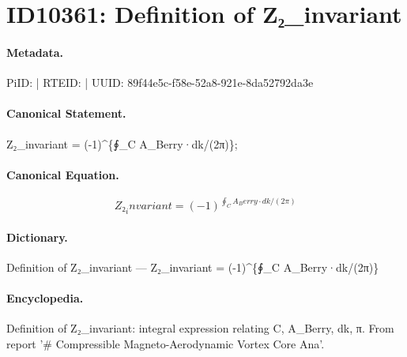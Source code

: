 \section*{ID10361: Definition of Z₂\_invariant}
\paragraph{Metadata.}
PiID:  | RTEID:  | UUID: 89f44e5c-f58e-52a8-921e-8da52792da3e

\paragraph{Canonical Statement.}
Z₂\_invariant = (-1)\textasciicircum{}\{∮\_C A\_Berry·dk/(2π)\};

\paragraph{Canonical Equation.}
\[
Z₂_invariant = (-1)^{∮_C A_Berry·dk/(2π)}
\]

\paragraph{Dictionary.}
Definition of Z₂\_invariant — Z₂\_invariant = (-1)\textasciicircum{}\{∮\_C A\_Berry·dk/(2π)\}

\paragraph{Encyclopedia.}
Definition of Z₂\_invariant: integral expression relating C, A\_Berry, dk, π. From report '\# Compressible Magneto-Aerodynamic Vortex Core Ana'.
